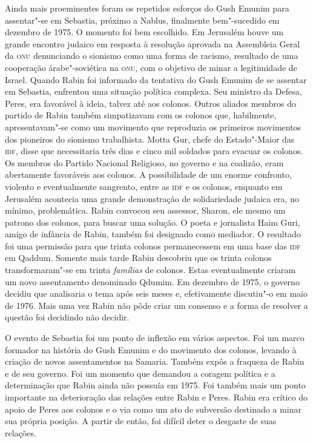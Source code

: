 Ainda mais proeminentes foram os repetidos esforços do Gush Emunim para
assentar"-se em Sebastia, próximo a Nablus, finalmente bem"-sucedido em
dezembro de 1975. O momento foi bem escolhido. Em Jerusalém houve um
grande encontro judaico em resposta à resolução aprovada na Assembleia
Geral da \textsc{onu} denunciando o sionismo como uma forma de racismo, resultado
de uma cooperação árabe"-soviética na \textsc{onu}, com o objetivo de minar a
legitimidade de Israel. Quando Rabin foi informado da tentativa do Gush
Emunim de se assentar em Sebastia, enfrentou uma situação política
complexa. Seu ministro da Defesa, Peres, era favorável à ideia, talvez
até aos colonos. Outros aliados membros do partido de Rabin também
simpatizavam com os colonos que, habilmente, apresentavam"-se como um
movimento que reproduzia os primeiros movimentos dos pioneiros do
sionismo trabalhista. Motta Gur, chefe do Estado"-Maior das \textsc{idf}, disse
que necessitaria três dias e cinco mil soldados para evacuar os colonos.
Os membros do Partido Nacional Religioso, no governo e na coalizão, eram
abertamente favoráveis aos colonos. A possibilidade de um enorme
confronto, violento e eventualmente sangrento, entre as \textsc{idf} e os
colonos, enquanto em Jerusalém acontecia uma grande demonstração de
solidariedade judaica era, no mínimo, problemática. Rabin convocou seu
assessor, Sharon, ele mesmo um patrono dos colonos, para buscar uma
solução. O poeta e jornalista Haim Guri, amigo de infância de Rabin,
também foi designado como mediador. O resultado foi uma
permissão para que trinta colonos permanecessem em uma base das \textsc{idf} em
Qaddum. Somente mais tarde Rabin descobriu que os trinta colonos
transformaram"-se em trinta \emph{famílias} de colonos. Estas
eventualmente criaram um novo assentamento denominado Qdumim. Em
dezembro de 1975, o governo decidiu que analisaria o tema após seis meses
e, efetivamente discutiu"-o em maio de 1976. Mais uma vez Rabin não pôde
criar um consenso e a forma de resolver a questão foi decidindo não
decidir.

O evento de Sebastia foi um ponto de inflexão em vários aspectos. Foi um
marco formador na história do Gush Emunim e do movimento dos colonos,
levando à criação de novos assentamentos na Samaria. Também expôs a
fraqueza de Rabin e de seu governo. Foi um momento que demandou a
coragem política e a determinação que Rabin ainda não possuía em 1975.
Foi também mais um ponto importante na deterioração das relações entre
Rabin e Peres. Rabin era crítico do apoio de Peres aos colonos e o via
como um ato de subversão destinado a minar sua própria posição. A partir
de então, foi difícil deter o desgaste de suas relações.

